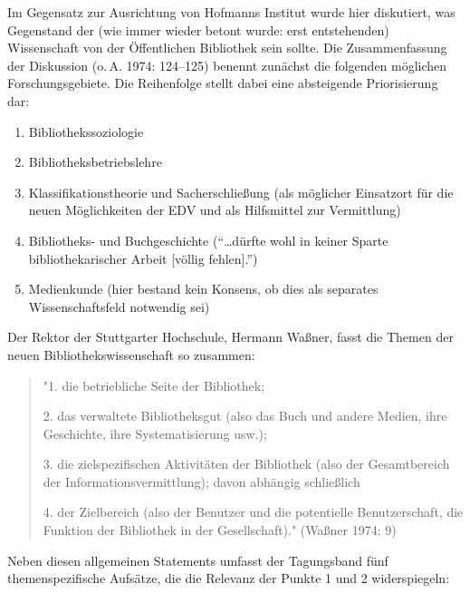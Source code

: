 \documentclass[a4paper,
fontsize=11pt,
oneside,
numbers=noperiodatend,
parskip=half-,
bibliography=totoc,
final
]{scrartcl}
\begin{document}
Im Gegensatz zur Ausrichtung von Hofmanns Institut wurde hier
diskutiert, was Gegenstand der (wie immer wieder betont wurde: erst
entstehenden) Wissenschaft von der Öffentlichen Bibliothek sein sollte.
Die Zusammenfassung der Diskussion (o.\,A. 1974: 124--125) benennt
zunächst die folgenden möglichen Forschungsgebiete. Die Reihenfolge
stellt dabei eine absteigende Priorisierung dar:

\begin{enumerate}
\def\labelenumi{\arabic{enumi}.}
\item
  Bibliothekssoziologie
\item
  Bibliotheksbetriebslehre
\item
  Klassifikationstheorie und Sacherschließung (als möglicher Einsatzort
  für die neuen Möglichkeiten der EDV und als Hilfsmittel zur
  Vermittlung)
\item
  Bibliotheks- und Buchgeschichte (\enquote{\ldots dürfte wohl in keiner
  Sparte bibliothekarischer Arbeit {[}völlig fehlen{]}.})
\item
  Medienkunde (hier bestand kein Konsens, ob dies als separates
  Wissenschaftsfeld notwendig sei)
\end{enumerate}

Der Rektor der Stuttgarter Hochschule, Hermann Waßner, fasst die Themen
der neuen Bibliothekswissenschaft so zusammen:

\begin{quote}
"1. die betriebliche Seite der Bibliothek;

2. das verwaltete Bibliotheksgut (also das Buch und andere Medien, ihre
Geschichte, ihre Systematisierung usw.);

3. die zielspezifischen Aktivitäten der Bibliothek (also der
Gesamtbereich der Informationsvermittlung); davon abhängig schließlich

4. der Zielbereich (also der Benutzer und die potentielle
Benutzerschaft, die Funktion der Bibliothek in der Gesellschaft)."
(Waßner 1974: 9)
\end{quote}

Neben diesen allgemeinen Statements umfasst der Tagungsband fünf
themenspezifische Aufsätze, die die Relevanz der Punkte 1 und 2
widerspiegeln:
\end{document}
